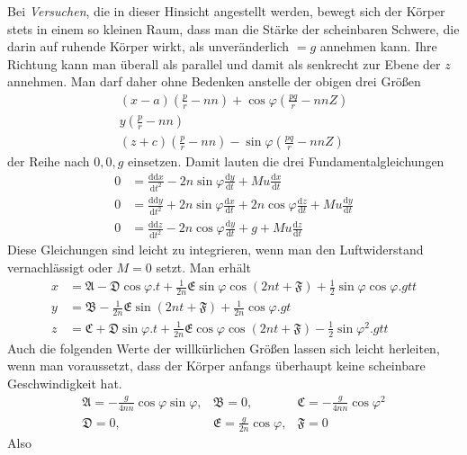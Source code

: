 Bei \textit{Versuchen}, die in dieser Hinsicht angestellt werden, bewegt sich der Körper stets in einem so kleinen Raum, dass man die Stärke der scheinbaren Schwere, die darin auf ruhende Körper wirkt, als unveränderlich $=g$ annehmen kann. Ihre Richtung kann man überall als parallel und damit als senkrecht zur Ebene der $z$ annehmen. Man darf daher ohne Bedenken anstelle der obigen drei Größen
\[
\begin{gathered}
(x-a)(\tfrac pr-nn)+\cos\varphi(\tfrac{pq}{r}-nnZ)\\
y(\tfrac pr-nn)\\
(z+c)(\tfrac pr-nn)-\sin\varphi(\tfrac{pq}{r}-nnZ)
\end{gathered}
\]
der Reihe nach $0,0,g$ einsetzen. Damit lauten die drei Fundamentalgleichungen
\[
\begin{aligned}
0&=\frac{\mathrm{dd}x}{\mathrm{d}t^2}-2n\sin\varphi\frac{\mathrm{d}y}{\mathrm{d}t}+Mu\frac{\mathrm{d}x}{\mathrm{d}t}\\
0&=\frac{\mathrm{dd}y}{\mathrm{d}t^2}+2n\sin\varphi\frac{\mathrm{d}x}{\mathrm{d}t}+2n\cos\varphi\frac{\mathrm{d}z}{\mathrm{d}t}+Mu\frac{\mathrm{d}y}{\mathrm{d}t}\\
0&=\frac{\mathrm{dd}z}{\mathrm{d}t^2}-2n\cos\varphi\frac{\mathrm{d}y}{\mathrm{d}t}+g+Mu\frac{\mathrm{d}z}{\mathrm{d}t}
\end{aligned}
\]
Diese Gleichungen sind leicht zu integrieren, wenn man den Luftwiderstand vernachlässigt oder $M=0$ setzt. Man erhält
\[
\begin{aligned}
x&=\mathfrak{A}-\mathfrak{D}\cos\varphi.t+\tfrac{1}{2n}\mathfrak{E}\sin\varphi\cos(2nt+\mathfrak{F})+\tfrac12\sin\varphi\cos\varphi.gtt\\
y&=\mathfrak{B}-\tfrac{1}{2n}\mathfrak{E}\sin(2nt+\mathfrak{F})+\tfrac{1}{2n}\cos\varphi.gt\\
z&=\mathfrak{C}+\mathfrak{D}\sin\varphi.t+\tfrac{1}{2n}\mathfrak{E}\cos\varphi\cos(2nt+\mathfrak{F})-\tfrac12\sin\varphi^2.gtt
\end{aligned}
\]
Auch die folgenden Werte der willkürlichen Größen lassen sich leicht herleiten, wenn man voraussetzt, dass der Körper anfangs überhaupt keine scheinbare Geschwindigkeit hat.
\[
\begin{array}{lll}
\mathfrak{A}=-\tfrac{g}{4nn}\cos\varphi\sin\varphi,&\mathfrak{B}=0,&\mathfrak{C}=-\tfrac{g}{4nn}\cos\varphi^2\\
\mathfrak{D}=0,&\mathfrak{E}=\tfrac{g}{2n}\cos\varphi,&\mathfrak{F}=0
\end{array}
\]
Also
